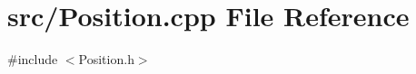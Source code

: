 \section{src/\+Position.cpp File Reference}
\label{_position_8cpp}
{\ttfamily \#include $<$Position.\+h$>$}\newline
